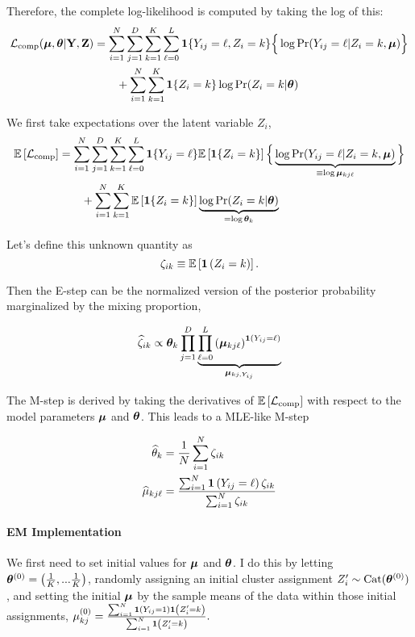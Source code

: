 \documentclass[11pt]{article}
\begin{document}
Therefore, the complete log-likelihood is computed by taking the log of this:
\begin{align}
\mathcal{L}_{\text{comp}}(\bm{\mu}, \bm{\theta}|\mathbf{Y}, \mathbf{Z})
& = \sum^{N}_{i=1}\sum^{D}_{j=1}\sum^{K}_{k=1}\sum^{L}_{\ell = 0}
\bm{1}\{Y_{ij} = \ell, Z_{i} = k\}\Big\{
\log \Pr(Y_{ij} = \ell | Z_{i} = k, \bm{\mu})
\Big\} \nonumber\\
& \qquad +
\sum^N_{i=1}\sum^{K}_{k=1}\bm{1}\{Z_{i} = k\}\log \Pr(Z_{i} = k | \bm{\theta})
\end{align}

We first take expectations over the latent variable $Z_{i}$,
\begin{align}
\mathbb{E}\left[\mathcal{L}_{\text{comp}}\right]
& = \sum^{N}_{i=1}\sum^{D}_{j=1}\sum^{K}_{k=1}\sum^{L}_{\ell = 0}
\bm{1}\{Y_{ij} = \ell\} \mathbb{E}\left[\bm{1}\{Z_{i} = k\}\right]\Big\{
\underbrace{\log \Pr(Y_{ij} = \ell | Z_{i} = k, \bm{\mu})}_{\equiv \log\bm{\mu}_{kj\ell}}
\Big\} \nonumber\\
& \qquad +
\sum^{N}_{i=1}\sum^{K}_{k=1}\mathbb{E}\left[\bm{1}\{Z_{i} = k\}\right]\underbrace{\log \Pr(Z_{i} = k | \bm{\theta})}_{= \log \bm{\theta}_{k}}
\end{align}

 Let's define this unknown quantity as 
\[\zeta_{ik} \equiv \mathbb{E}\left[\bm{1}\left(Z_i = k\right)\right].\]

Then the E-step can be the normalized version of the posterior probability marginalized by the mixing proportion,

\begin{align}
\widehat{\zeta}_{ik} \propto \bm{\theta}_k\prod^D_{j = 1}\underbrace{\prod^{L}_{\ell = 0}\left(\bm{\mu}_{kj\ell}\right)^{\bm{1}\left(Y_{ij} = \ell\right)}}_{\bm{\mu}_{kj, Y_{ij}}}
\end{align}

The M-step is derived by taking the derivatives of \(\mathbb{E}\left[\mathcal{L}_{\text{comp}}\right]\) with respect to the model parameters \(\bm{\mu}\) and \(\bm{\theta}\). This leads to a MLE-like M-step

\begin{align}
\widehat{\theta}_{k} &= \frac{1}{N}\sum^N_{i = 1}\zeta_{ik}\\
\widehat{\mu}_{kj\ell} &= \frac{\sum^N_{i=1}\bm{1}\left(Y_{ij} = \ell\right)\zeta_{ik}}{\sum^{N}_{i=1}\zeta_{ik}}
\end{align}


\paragraph{EM Implementation} We first need to set initial values for \(\bm{\mu}\) and \(\bm{\theta}\). I do this by letting \(\bm{\theta}^{(0)} = \left(\frac{1}{K},...\frac{1}{K}\right)\), randomly assigning an initial cluster assignment \(Z_i^\prime \sim \text{Cat}(\bm{\theta}^{(0)})\), and setting the initial \(\bm{\mu}\) by the sample means of the data within those initial assignments, \(\mu_{kj}^{(0)} = \frac{\sum_{i=1}^{N}\bm{1}\left(Y_{ij} = 1\right)\bm{1}\left(Z_{i}^{\prime} = k\right)}{\sum_{i=1}^{N}\bm{1}\left(Z_{i}^{\prime} = k\right)}.\) 
\end{document}
